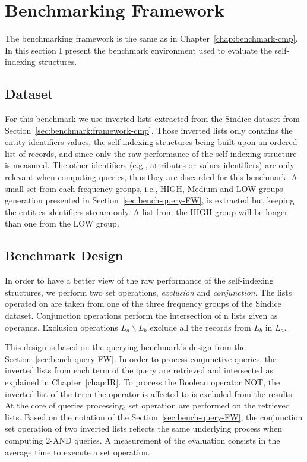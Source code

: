 \section{Benchmarking Framework}

The benchmarking framework is the same as in
Chapter~\ref{chap:benchmark-cmp}. In this section I present the benchmark
environment used to evaluate the self-indexing structures.

\subsection{Dataset}

For this benchmark we use inverted lists extracted from the Sindice dataset
from Section~\ref{sec:benchmark:framework-cmp}. Those inverted lists only
contains the entity identifiers values, the self-indexing structures being
built upon an ordered list of records, and since only the raw performance of the
self-indexing structure is measured. The other identifiers (e.g., attributes
or values identifiers) are only relevant when computing queries, thus they are
discarded for this benchmark. A small set from each frequency groups, i.e.,
HIGH, Medium and LOW groups generation presented in
Section~\ref{sec:bench-query-FW}, is extracted but keeping the entities
identifiers stream only. A list from the HIGH group will be longer than one
from the LOW group.

\subsection{Benchmark Design}

In order to have a better view of the raw performance of the self-indexing
structures, we perform two set operations, \emph{exclusion} and
\emph{conjunction}. The lists operated on are taken from one of the
three frequency groups of the Sindice dataset. Conjunction operations perform
the intersection of n lists given as operands. Exclusion operations $L_a
\backslash L_b$ exclude all the records from $L_b$ in $L_a$.

This design is based on the querying benchmark's design from the
Section~\ref{sec:bench-query-FW}. In order to process conjunctive queries, the
inverted lists from each term of the query are retrieved and intersected as
explained in Chapter~\ref{chap:IR}. To process the Boolean operator NOT,
the inverted list of the term the operator is affected to is excluded from the
results. At the core of queries processing, set operation are performed on the
retrieved lists. Based on the notation of the Section~\ref{sec:bench-query-FW},
the conjunction set operation of two inverted lists reflects the same
underlying process when computing 2-AND queries.
A measurement of the evaluation consists in the average time to execute a set
operation.

